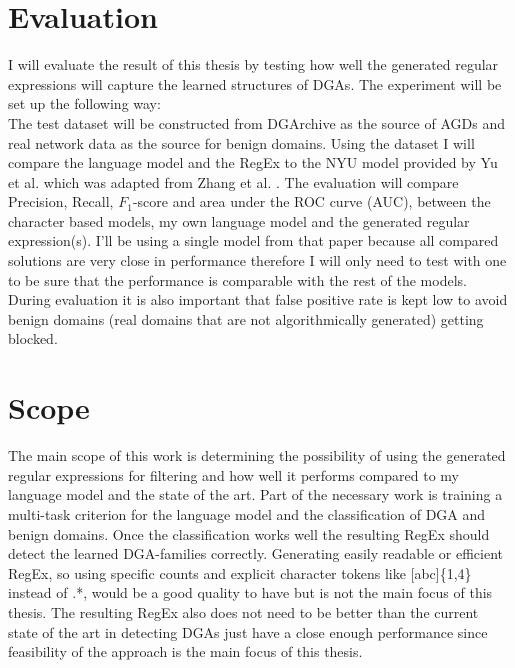 \documentclass[a4paper, 12pt]{article}
\begin{document}
\section{Evaluation}
I will evaluate the result of this thesis by testing how well the generated regular expressions
will capture the learned structures of DGAs.  
The experiment will be set up the following way:\\
The test dataset will be constructed from DGArchive\cite{DGArchiveFraunhoferFKIE} as the source of AGDs and
real network data as the source for benign domains.
Using the dataset I will compare the language model and the RegEx to the NYU model provided by Yu et
al. 
\cite{yuCharacterLevelBased2018} which was adapted from Zhang et al. \cite{NIPS2015_250cf8b5}. The evaluation will compare Precision, Recall,
$F_1$-score and area under the ROC curve (AUC), between the character based models, my own language
model and the generated regular expression(s). I'll be using a single model from that paper because
all compared solutions are very close in performance therefore I will only need to test with one to
be sure that the performance is comparable with the rest of the models.
During evaluation it is also important that false positive rate is kept low to avoid benign domains
(real domains that are not algorithmically generated) getting blocked.
\section{Scope}
The main scope of this work is determining the possibility of using the generated regular
expressions for filtering and how well it performs compared to my language model and the state of the art.
Part of the necessary work is training a multi-task criterion for the language model and the
classification of DGA and benign domains. 
Once the classification works well the resulting RegEx should detect the learned DGA-families
correctly. Generating easily readable or efficient RegEx, so using specific counts and explicit
character tokens like [abc]\{1,4\} instead of .*, would be a good quality to have but is not
the main focus of this thesis. 
The resulting RegEx also does not need to be better than the current state of the art in detecting
DGAs just have a close enough performance since feasibility of the approach is the main focus of
this thesis.
\end{document}

